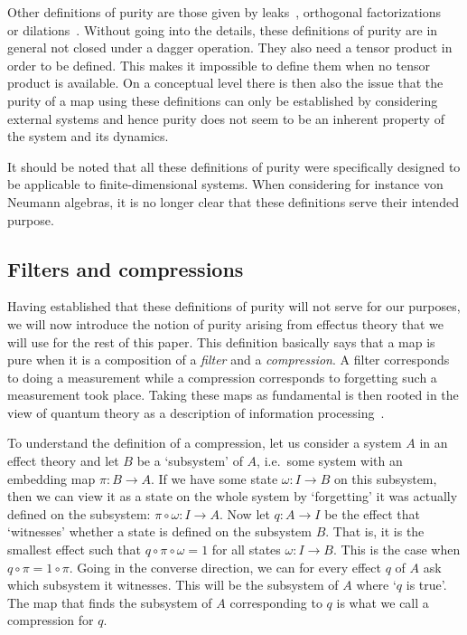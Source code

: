 \documentclass[b5paper,onecolumn,12pt,accepted=2019-05-03, issue=1, volume=1, shorttitle=papers/compositionality-1-1]{compositionalityarticle}
\numberwithin{counter}{section}
\begin{document}
Other definitions of purity are those given by leaks~\cite{selby2018reconstructing}, orthogonal factorizations~\cite{cunningham2017purity} or dilations~\cite{tull2019phdthesis}. Without going into the details, these definitions of purity are in general not closed under a dagger operation. They also need a tensor product in order to be defined. This makes it impossible to define them when no tensor product is available. On a conceptual level there is then also the issue that the purity of a map using these definitions can only be established by considering external systems and hence purity does not seem to be an inherent property of the system and its dynamics.

It should be noted that all these definitions of purity were specifically designed to be applicable to finite-dimensional systems. When considering for instance von Neumann algebras, it is no longer clear that these definitions serve their intended purpose.

\subsection{Filters and compressions}\label{sec:filterscompressions}
Having established that these definitions of purity will not serve for our purposes, we will now introduce the notion of purity arising from effectus theory that we will use for the rest of this paper. This definition basically says that a map is pure when it is a composition of a \emph{filter} and a \emph{compression}. A filter corresponds to doing a measurement while a compression corresponds to forgetting such a measurement took place. Taking these maps as fundamental is then rooted in the view of quantum theory as a description of information processing~\cite{fuchs2002quantum}.

To understand the definition of a compression, let us consider a system $A$ in an effect theory and let $B$ be a `subsystem' of $A$, i.e.\ some system with an embedding map $\pi: B\rightarrow A$. 
If we have some state $\omega:I\rightarrow B$ on this subsystem, then we can view it as a state on the whole system by `forgetting' it was actually defined on the subsystem: $\pi\circ \omega: I\rightarrow A$. Now let $q:A\rightarrow I$ be the effect that `witnesses' whether a state is defined on the subsystem $B$. That is, it is the smallest effect such that $q\circ \pi\circ\omega = 1$ for all states $\omega:I\rightarrow B$. This is the case when $q\circ \pi = 1\circ \pi$. Going in the converse direction, we can for every effect $q$ of $A$ ask which subsystem it witnesses. This will be the subsystem of $A$ where `$q$ is true'. The map that finds the subsystem of $A$ corresponding to $q$ is what we call a compression for $q$.
\end{document}
